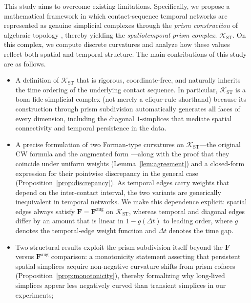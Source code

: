 \documentclass[
    pre,
    twocolumn,
    superscriptaddress,
    showpacs,
    nofootinbib,
    amsmath,
    amssymb,
    floatfix
]{revtex4-2}
\newcommand{\K}{\mathcal{K}}
\newcommand{\F}{\mathbf{F}}        %
\newcommand{\Faug}{\F^{\mathrm{aug}}}
\newcommand{\dt}{\Delta t}
\theoremstyle{plain} %
\theoremstyle{definition} %
\begin{document}
This study aims to overcome existing limitations.  Specifically, we
propose a mathematical framework in which contact-sequence temporal
networks are represented as genuine simplicial complexes through the
\emph{prism construction} of algebraic topology \cite{Hatcher2002}, thereby
yielding the \emph{spatiotemporal prism complex}.
$\K_{\mathrm{ST}}$.  On this complex, we compute discrete curvatures
and analyze how these values reflect both spatial and temporal
structure.  The main contributions of this study are as follows.
\begin{itemize}
\item[(i)] A definition of $\K_{\mathrm{ST}}$ that is rigorous,
      coordinate-free, and naturally inherits the time ordering of the
      underlying contact sequence.  In particular, $\K_{\mathrm{ST}}$
      is a bona fide simplicial complex (not merely a clique-rule
      shorthand) because its construction through prism subdivision
      automatically generates all faces of every dimension, including
      the diagonal $1$-simplices that mediate spatial connectivity
      and temporal persistence in the data.
\item[(ii)] A precise formulation of two Forman-type curvatures on
      $\K_{\mathrm{ST}}$---the original CW formula
      \cite{Forman2003} and the augmented form \cite{Sreejith2016}---along with the proof that they coincide under uniform weights
      (Lemma~\ref{lem:agreement}) and a closed-form expression for
      their pointwise discrepancy in the general case
      (Proposition~\ref{prop:discrepancy}).  As temporal edges
      carry weights that depend on the inter-contact interval, the
      two variants are generically inequivalent in temporal networks.
      We make this dependence explicit: spatial edges always satisfy
      $\F=\Faug$ on $\K_{\mathrm{ST}}$, whereas temporal and diagonal
      edges differ by an amount that is linear in $1-g(\dt)$ to leading
      order, where $g$ denotes the temporal-edge weight function and
      $\dt$ denotes the time gap.
\item[(ii$'$)] Two structural results exploit the prism subdivision itself beyond the $\F$ versus $\Faug$ comparison: a monotonicity statement asserting that persistent spatial simplices acquire non-negative curvature shifts from prism cofaces (Proposition~\ref{prop:monotonicity}), thereby formalizing why long-lived simplices appear less negatively curved than transient simplices in our experiments;

\end{itemize}
\end{document}
